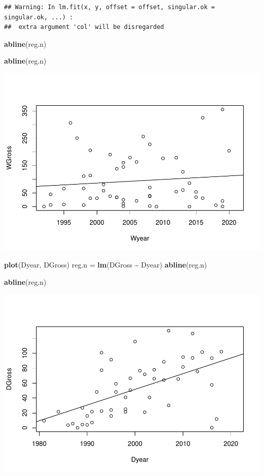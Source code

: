 \documentclass[]{article}
\newenvironment{Shaded}{\begin{snugshade}}{\end{snugshade}}
\newcommand{\KeywordTok}[1]{\textcolor[rgb]{0.13,0.29,0.53}{\textbf{#1}}}
\newcommand{\NormalTok}[1]{#1}
\newcommand{\OperatorTok}[1]{\textcolor[rgb]{0.81,0.36,0.00}{\textbf{#1}}}
\newcommand{\StringTok}[1]{\textcolor[rgb]{0.31,0.60,0.02}{#1}}
\begin{document}
\begin{verbatim}
## Warning: In lm.fit(x, y, offset = offset, singular.ok = singular.ok, ...) :
##  extra argument 'col' will be disregarded
\end{verbatim}

\begin{Shaded}
\begin{Highlighting}[]
\KeywordTok{abline}\NormalTok{(reg.n)}

\KeywordTok{abline}\NormalTok{(reg.n)}
\end{Highlighting}
\end{Shaded}

\includegraphics{Denzel-v-Will-data_files/figure-latex/unnamed-chunk-5-7.pdf}

\begin{Shaded}
\begin{Highlighting}[]
\KeywordTok{plot}\NormalTok{(Dyear, DGross)}
\NormalTok{reg.n =}\StringTok{ }\KeywordTok{lm}\NormalTok{(DGross }\OperatorTok{\textasciitilde{}}\StringTok{ }\NormalTok{Dyear)}
\KeywordTok{abline}\NormalTok{(reg.n)}

\KeywordTok{abline}\NormalTok{(reg.n)}
\end{Highlighting}
\end{Shaded}

\includegraphics{Denzel-v-Will-data_files/figure-latex/unnamed-chunk-5-8.pdf}
\end{document}
